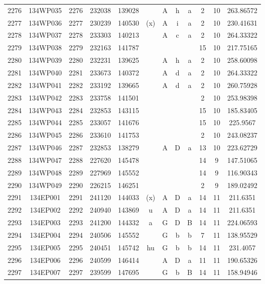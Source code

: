 \begin{tabular}{|*{12}{c|}}
2276 & 134WP035 & 2276 & 232038 & 139028 &  & A & h & a & 2 & 10 & 263.86572 \\ 
2277 & 134WP036 & 2277 & 230239 & 140530 & (x) & A & i & a & 2 & 10 & 230.41631 \\ 
2278 & 134WP037 & 2278 & 233303 & 140213 &  & A & c & a & 2 & 10 & 264.33322 \\ 
2279 & 134WP038 & 2279 & 232163 & 141787 &  &  &  &  & 15 & 10 & 217.75165 \\ 
2280 & 134WP039 & 2280 & 232231 & 139625 &  & A & h & a & 2 & 10 & 258.60098 \\ 
2281 & 134WP040 & 2281 & 233673 & 140372 &  & A & d & a & 2 & 10 & 264.33322 \\ 
2282 & 134WP041 & 2282 & 233192 & 139665 &  & A & d & a & 2 & 10 & 260.75928 \\ 
2283 & 134WP042 & 2283 & 233758 & 141501 &  &  &  &  & 2 & 10 & 253.98398 \\ 
2284 & 134WP043 & 2284 & 232853 & 143115 &  &  &  &  & 15 & 10 & 185.83405 \\ 
2285 & 134WP044 & 2285 & 233057 & 141676 &  &  &  &  & 15 & 10 & 225.9567 \\ 
2286 & 134WP045 & 2286 & 233610 & 141753 &  &  &  &  & 2 & 10 & 243.08237 \\ 
2287 & 134WP046 & 2287 & 232853 & 138279 &  & A & D & a & 13 & 10 & 223.62729 \\ 
2288 & 134WP047 & 2288 & 227620 & 145478 &  &  &  &  & 14 & 9 & 147.51065 \\ 
2289 & 134WP048 & 2289 & 227969 & 145552 &  &  &  &  & 14 & 9 & 116.90343 \\ 
2290 & 134WP049 & 2290 & 226215 & 146251 &  &  &  &  & 2 & 9 & 189.02492 \\ 
2291 & 134EP001 & 2291 & 241120 & 144033 & (x) & A & D & a & 14 & 11 & 211.6351 \\ 
2292 & 134EP002 & 2292 & 240940 & 143869 & u & A & D & a & 14 & 11 & 211.6351 \\ 
2293 & 134EP003 & 2293 & 241200 & 144332 & a & G & D & B & 14 & 11 & 224.06593 \\ 
2294 & 134EP004 & 2294 & 240506 & 145552 &  & G & b & b & 7 & 11 & 138.95529 \\ 
2295 & 134EP005 & 2295 & 240451 & 145742 & hu & G & b & b & 14 & 11 & 231.4057 \\ 
2296 & 134EP006 & 2296 & 240599 & 146414 &  & A & D & a & 11 & 11 & 190.65326 \\ 
2297 & 134EP007 & 2297 & 239599 & 147695 &  & G & b & B & 14 & 11 & 158.94946 \\ 

\end{tabular}

